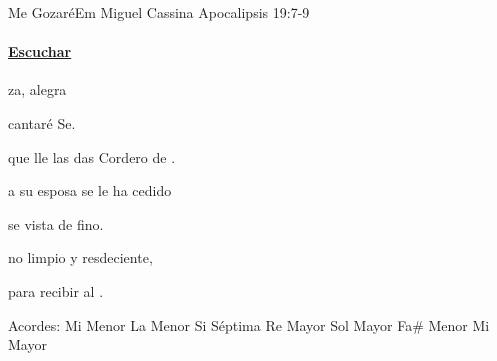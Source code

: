 \documentclass[12pt, spanish]{book}
\begin{document}
    \begin{song}{Me Gozaré}{Em}
    {} %
    {Miguel Cassina}
    {Apocalipsis 19:7-9} %
    {}
        \ifChordBk
        \paragraph{\mbox{}\hfill\protect\href{https://open.spotify.com/intl-es/track/6lefLtQ56C2P4pOT0QTm2p}{Escuchar}\mbox{}\hfill}
        \fi

        \begin{SBOpGroup}
             za,  alegra

             cantaré  Se.

            que  lle las das
             Cordero de .
        \end{SBOpGroup}

        \begin{SBOpGroup}
             a su esposa se le ha cedido

             se vista de  fino.

            no limpio y resdeciente,

            para recibir al .
        \end{SBOpGroup}

        \ifChordBk
        \begin{SBOpGroup}
            Acordes:
            \upchord{\Em}\qquad Mi Menor \hfill
            \upchord{\Am}\qquad La Menor \hfill\null\break
            \upchord{\Bseven}\qquad\qquad Si S\'eptima \hfill
            \upchord{\D}\qquad Re Mayor \hfill\null\break
            \upchord{\G}\qquad Sol Mayor \hfill
            \upchord{\Fsm}\qquad Fa\# Menor \hfill
            \upchord{\E}\qquad Mi Mayor \hfill\null\break
        \end{SBOpGroup}
        \fi
    \end{song}
\end{document}
